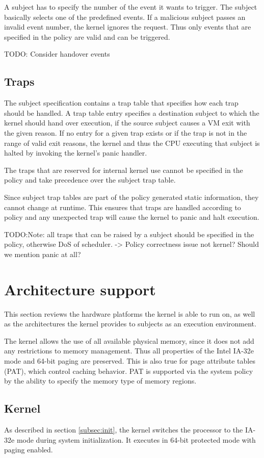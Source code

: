 A subject has to specify the number of the event it wants to trigger. The
subject basically selects one of the predefined events. If a malicious subject
passes an invalid event number, the kernel ignores the request. Thus only events
that are specified in the policy are valid and can be triggered.

TODO: Consider handover events

\subsection{Traps}
The subject specification contains a trap table that specifies how each trap
should be handled. A trap table entry specifies a destination subject to which
the kernel should hand over execution, if the source subject causes a VM exit
with the given reason. If no entry for a given trap exists or if the trap is not
in the range of valid exit reasons, the kernel and thus the CPU executing that
subject is halted by invoking the kernel's panic handler.

The traps that are reserved for internal kernel use cannot be specified in the
policy and take precedence over the subject trap table.

Since subject trap tables are part of the policy generated static information,
they cannot change at runtime. This ensures that traps are handled according to
policy and any unexpected trap will cause the kernel to panic and halt
execution.

TODO:Note: all traps that can be raised by a subject should be specified in the
policy, otherwise DoS of scheduler. -> Policy correctness issue not kernel? Should
we mention panic at all?

\section{Architecture support}
This section reviews the hardware platforms the kernel is able to run on, as
well as the architectures the kernel provides to subjects as an execution
environment.

The kernel allows the use of all available physical memory, since it does not
add any restrictions to memory management. Thus all properties of the Intel
IA-32e mode and 64-bit paging are preserved. This is also true for page
attribute tables (PAT), which control caching behavior. PAT is supported via the
system policy by the ability to specify the memory type of memory regions.

\subsection{Kernel}
As described in section \ref{subsec:init}, the kernel switches the processor to
the IA-32e mode during system initialization. It executes in 64-bit protected
mode with paging enabled.

